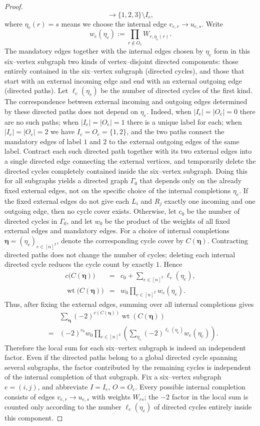 \documentclass[11pt,a4paper]{article}
\begin{document}
\begin{proof}
\[  \longrightarrow\{1,2,3\}\setminus I_e,
\]
where $\eta_e(r)=s$ means we choose the internal edge $v_{e,r}\to u_{e,s}$. Write
\[
  w_e(\eta_e):=\prod_{r\notin O_e}W_{r,\eta_e(r)}.
\]
The mandatory edges together with the internal edges chosen by $\eta_e$ form in this six–vertex subgraph two kinds of vertex–disjoint directed components: those entirely contained in the six–vertex subgraph (directed cycles), and those that start with an external incoming edge and end with an external outgoing edge (directed paths). Let $\ell_e(\eta_e)$ be the number of directed cycles of the first kind.
The correspondence between external incoming and outgoing edges determined by these directed paths does not depend on $\eta_e$. Indeed, when $|I_e|=|O_e|=0$ there are no such paths; when $|I_e|=|O_e|=1$ there is a unique label for each; when $|I_e|=|O_e|=2$ we have $I_e=O_e=\{1,2\}$, and the two paths connect the mandatory edges of label $1$ and $2$ to the external outgoing edges of the same label. Contract each such directed path together with its two external edges into a single directed edge connecting the external vertices, and temporarily delete the directed cycles completely contained inside the six–vertex subgraph. Doing this for all subgraphs yields a directed graph $\Gamma_0$ that depends only on the already fixed external edges, not on the specific choice of the internal completions $\eta_e$.
If the fixed external edges do not give each $L_i$ and $R_j$ exactly one incoming and one outgoing edge, then no cycle cover exists. Otherwise, let $c_0$ be the number of directed cycles in $\Gamma_0$, and let $w_0$ be the product of the weights of all fixed external edges and mandatory edges. For a choice of internal completions $\boldsymbol\eta=(\eta_e)_{e\in[n]^2}$, denote the corresponding cycle cover by $C(\boldsymbol\eta)$. Contracting directed paths does not change the number of cycles; deleting each internal directed cycle reduces the cycle count by exactly $1$. Hence
\begin{eqnarray*}
  c\bigl(C(\boldsymbol\eta)\bigr)
  &=&c_0+\sum_{e\in[n]^2}\ell_e(\eta_e),\\
  \operatorname{wt}\bigl(C(\boldsymbol\eta)\bigr)
  &=&w_0\prod_{e\in[n]^2}w_e(\eta_e).
\end{eqnarray*}
Thus, after fixing the external edges, summing over all internal completions gives
\begin{eqnarray*}
 &&\sum_{\boldsymbol\eta}
 (-2)^{c(C(\boldsymbol\eta))}\operatorname{wt}(C(\boldsymbol\eta))\\
 &=&(-2)^{c_0}w_0
 \prod_{e\in[n]^2}\left(\sum_{\eta_e}
 (-2)^{\ell_e(\eta_e)}w_e(\eta_e)\right).
\end{eqnarray*}
Therefore the local sum for each six–vertex subgraph is indeed an independent factor. Even if the directed paths belong to a global directed cycle spanning several subgraphs, the factor contributed by the remaining cycles is independent of the internal completion of that subgraph.
Fix a six–vertex subgraph $e=(i,j)$, and abbreviate $I=I_e$, $O=O_e$. Every possible internal completion consists of edges $v_{e,r}\to u_{e,s}$ with weights $W_{rs}$; the $-2$ factor in the local sum is counted only according to the number $\ell_e(\eta_e)$ of directed cycles entirely inside this component.


\end{proof}
\end{document}
